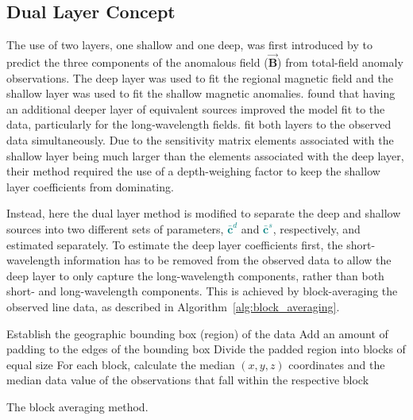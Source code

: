 \subsection{Dual Layer Concept}

The use of two layers, one shallow and one deep, was first introduced by \citet{Li2020} to predict the three components of the anomalous field ($\vec{\mathbf{B}}$) from total-field anomaly observations. The deep layer was used to fit the regional magnetic field and the shallow layer was used to fit the shallow magnetic anomalies. \citet{Li2020} found that having an additional deeper layer of equivalent sources improved the model fit to the data, particularly for the long‐wavelength fields. \citet{Li2020} fit both layers to the observed data simultaneously. Due to the sensitivity matrix elements associated with the shallow layer being much larger than the elements associated with the deep layer, their method required the use of a depth-weighing factor to keep the shallow layer coefficients from dominating.

Instead, here the dual layer method is modified to separate the deep and shallow sources into two different sets of parameters, \textcolor{teal}{$\bar{\mathbf{c}}^d$} and \textcolor{teal}{$\bar{\mathbf{c}}^s$}, respectively, and estimated separately. To estimate the deep layer coefficients first, the short-wavelength information has to be removed from the observed data to allow the deep layer to only capture the long-wavelength components, rather than both short- and long-wavelength components. This is achieved by block-averaging the observed line data, as described in Algorithm~\ref{alg:block_averaging}.

\begin{algorithm}[!h]
  Establish the geographic bounding box (region) of the data
  \;
  Add an amount of padding to the edges of the bounding box
  \;
  Divide the padded region into blocks of equal size
  \;
  For each block, calculate the median $(x, y, z)$ coordinates and the median data value of the observations that fall within the respective block
  \;
  \BlankLine
  \caption{The block averaging method.}
  \label{alg:block_averaging}
\end{algorithm}


